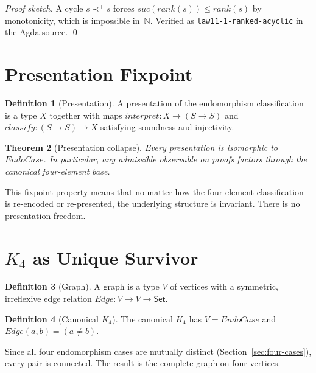 \documentclass[11pt,a4paper]{article}
\newtheorem{theorem}{Theorem}[section]
\theoremstyle{definition}
\newtheorem{definition}[theorem]{Definition}
\begin{document}
\begin{proof}[Proof sketch]
A cycle $s \prec^+ s$ forces $\mathit{suc}(\mathit{rank}(s)) \le
\mathit{rank}(s)$ by monotonicity, which is impossible in~$\mathbb{N}$.
Verified as \texttt{law11-1-ranked-acyclic} in the Agda source.
\qed
\end{proof}

\section{Presentation Fixpoint}
\label{sec:fixpoint}

\begin{definition}[Presentation]
A presentation of the endomorphism classification is a type $X$ together
with maps $\mathit{interpret} : X \to (S \to S)$ and
$\mathit{classify} : (S \to S) \to X$ satisfying soundness and
injectivity.
\end{definition}

\begin{theorem}[Presentation collapse]
\label{thm:presentation}
Every presentation is isomorphic to $\mathit{EndoCase}$.  In particular,
any admissible observable on proofs factors through the canonical
four-element base.
\end{theorem}

This fixpoint property means that no matter how the four-element
classification is re-encoded or re-presented, the underlying structure is
invariant.  There is no presentation freedom.

\section{$K_4$ as Unique Survivor}
\label{sec:k4}

\begin{definition}[Graph]
A graph is a type $V$ of vertices with a symmetric, irreflexive edge
relation $\mathit{Edge} : V \to V \to \mathsf{Set}$.
\end{definition}

\begin{definition}[Canonical $K_4$]
The canonical $K_4$ has $V = \mathit{EndoCase}$ and
$\mathit{Edge}(a,b) = (a \neq b)$.
\end{definition}

Since all four endomorphism cases are mutually distinct
(Section~\ref{sec:four-cases}), every pair is connected.  The result is
the complete graph on four vertices.
\end{document}
